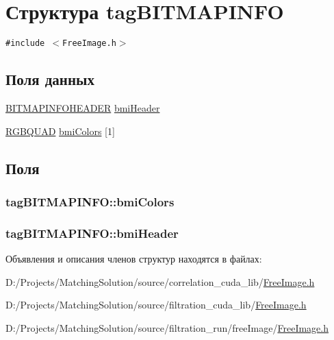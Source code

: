 \hypertarget{structtag_b_i_t_m_a_p_i_n_f_o}{
\section{Структура tagBITMAPINFO}
\label{structtag_b_i_t_m_a_p_i_n_f_o}
}
{\tt \#include $<$FreeImage.h$>$}

\subsection*{Поля данных}
\begin{CompactItemize}
\item 
\hyperlink{structtag_b_i_t_m_a_p_i_n_f_o_h_e_a_d_e_r}{BITMAPINFOHEADER} \hyperlink{structtag_b_i_t_m_a_p_i_n_f_o_1cbcd562dccbedec498b504f247405c3}{bmiHeader}
\item 
\hyperlink{structtag_r_g_b_q_u_a_d}{RGBQUAD} \hyperlink{structtag_b_i_t_m_a_p_i_n_f_o_26a12d549c6ede5c5eed907784f317bd}{bmiColors} \mbox{[}1\mbox{]}
\end{CompactItemize}


\subsection{Поля}
\hypertarget{structtag_b_i_t_m_a_p_i_n_f_o_26a12d549c6ede5c5eed907784f317bd}{
\subsubsection[{bmiColors}]{ {\bf tagBITMAPINFO::bmiColors}}}
\label{structtag_b_i_t_m_a_p_i_n_f_o_26a12d549c6ede5c5eed907784f317bd}


\hypertarget{structtag_b_i_t_m_a_p_i_n_f_o_1cbcd562dccbedec498b504f247405c3}{
\subsubsection[{bmiHeader}]{ {\bf tagBITMAPINFO::bmiHeader}}}
\label{structtag_b_i_t_m_a_p_i_n_f_o_1cbcd562dccbedec498b504f247405c3}




Объявления и описания членов структур находятся в файлах:\begin{CompactItemize}
\item 
D:/Projects/MatchingSolution/source/correlation\_\-cuda\_\-lib/\hyperlink{correlation__cuda__lib_2_free_image_8h}{FreeImage.h}\item 
D:/Projects/MatchingSolution/source/filtration\_\-cuda\_\-lib/\hyperlink{filtration__cuda__lib_2_free_image_8h}{FreeImage.h}\item 
D:/Projects/MatchingSolution/source/filtration\_\-run/freeImage/\hyperlink{filtration__run_2free_image_2_free_image_8h}{FreeImage.h}\end{CompactItemize}
